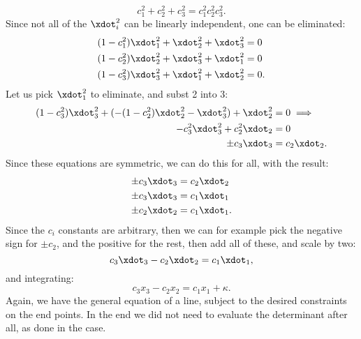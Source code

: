 {\begin{equation}
c_1^2 + c_2^2 + c_3^2 = c_1^2 c_2^2 c_3^2.
\end{equation}
%
Since not all of the \(\xdot_i^2\) can be linearly independent, one can be eliminated:
%
\begin{equation}\label{eqn:goldsteinCh12:740}
\begin{aligned}
(1 - c_1^2) \xdot_1^2 + \xdot_2^2 + \xdot_3^2 &= 0 \\
(1 - c_2^2) \xdot_2^2 + \xdot_3^2 + \xdot_1^2 &= 0 \\
(1 - c_3^2) \xdot_3^2 + \xdot_1^2 + \xdot_2^2 &= 0.
\end{aligned}
\end{equation}
%
Let us pick \(\xdot_1^2\) to eliminate, and subst 2 into 3:
%
\begin{equation}\label{eqn:goldsteinCh12:760}
\begin{aligned}
(1 - c_3^2) \xdot_3^2 + (-(1 - c_2^2) \xdot_2^2 - \xdot_3^2) + \xdot_2^2 &= 0
\implies \\
- c_3^2 \xdot_3^2 + c_2^2 \xdot_2 &= 0 \\
\pm c_3 \xdot_3 &= c_2 \xdot_2 .
\end{aligned}
\end{equation}
%
%
%
Since these equations are symmetric, we can do this for all, with the result:
\begin{equation}\label{eqn:goldsteinCh12:780}
\begin{aligned}
\pm c_3 \xdot_3 &= c_2 \xdot_2 \\
\pm c_3 \xdot_3 &= c_1 \xdot_1 \\
\pm c_2 \xdot_2 &= c_1 \xdot_1 .
\end{aligned}
\end{equation}
%
Since the \(c_i\) constants are arbitrary, then we can for example pick the negative sign for \(\pm c_2\), and the positive for the rest, then add all of these, and scale by two:
%
\begin{equation}\label{eqn:goldsteinCh12:1260}
c_3 \xdot_3 - c_2 \xdot_2 = c_1 \xdot_1,
\end{equation}
%
and integrating:
%
\begin{equation}\label{eqn:goldsteinCh12:1280}
c_3 x_3 - c_2 x_2 = c_1 x_1 + \kappa.
\end{equation}
%
Again, we have the general equation of a line, subject to the desired constraints on the end points.  In the end we did not need to
evaluate the determinant after all, as done in the  case.
}
%
